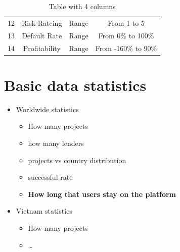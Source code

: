 \begin{table}[H]
\begin{tabular}{|c|c|c|c|}
		12 & Risk Rateing                  & Range           & From 1 to 5                                                                                                             \\
		13 & Default Rate                  & Range           & From 0\% to 100\%                                                                                                       \\
		14 & Profitability                 & Range           & From -160\% to 90\%                                                                                                     \\
		\hline
	\end{tabular}
	\caption{Table with 4 columns}
	\label{tab:mytable}
\end{table}






\section{Basic data statistics}

\begin{itemize}
	\item Worldwide statistics
	      \begin{itemize}
		      \item How many projects
		      \item how many lenders
		      \item projects vs country distribution
		      \item successful rate
		      \item \textbf{How long that users stay on the platform}
	      \end{itemize}
	\item Vietnam statistics
	      \begin{itemize}
		      \item How many projects
		      \item \dots
	      \end{itemize}
\end{itemize}